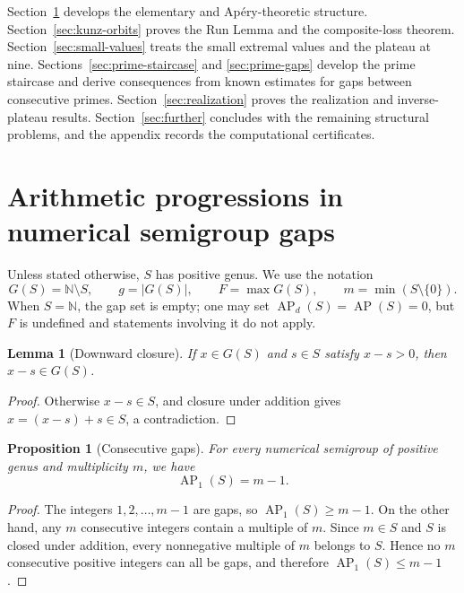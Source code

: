 \documentclass[11pt]{article}
\theoremstyle{plain}
\newtheorem{proposition}[theorem]{Proposition}
\newtheorem{lemma}[theorem]{Lemma}
\theoremstyle{definition}
\theoremstyle{remark}
\newcommand{\N}{\mathbb N}
\newcommand{\AP}{\operatorname{AP}}
\begin{document}
Section~\ref{sec:gap-aps} develops the elementary and Ap\'ery-theoretic
structure.  Section~\ref{sec:kunz-orbits} proves the Run Lemma and the
composite-loss theorem.  Section~\ref{sec:small-values} treats the small
extremal values and the plateau at nine.  Sections~\ref{sec:prime-staircase}
and \ref{sec:prime-gaps} develop the prime staircase and derive consequences
from known estimates for gaps between consecutive primes.
Section~\ref{sec:realization} proves the realization and
inverse-plateau results.  Section~\ref{sec:further} concludes with the
remaining structural problems, and the appendix records the computational
certificates.

\section{Arithmetic progressions in numerical semigroup gaps}
\label{sec:gap-aps}

Unless stated otherwise, $S$ has positive genus.  We use the notation
\[
  G(S)=\N\setminus S,
  \qquad g=|G(S)|,
  \qquad F=\max G(S),
  \qquad m=\min(S\setminus\{0\}).
\]
When $S=\N$, the gap set is empty; one may set $\AP_d(S)=\AP(S)=0$, but
$F$ is undefined and statements involving it do not apply.

\begin{lemma}[Downward closure]\label{lem:downward-closure}
If $x\in G(S)$ and $s\in S$ satisfy $x-s>0$, then $x-s\in G(S)$.
\end{lemma}

\begin{proof}
Otherwise $x-s\in S$, and closure under addition gives
$x=(x-s)+s\in S$, a contradiction.
\end{proof}

\begin{proposition}[Consecutive gaps]\label{prop:consecutive-gaps}
For every numerical semigroup of positive genus and multiplicity $m$, we have
\[
  \boxed{\AP_1(S)=m-1.}
\]
\end{proposition}

\begin{proof}
The integers $1,2,\ldots,m-1$ are gaps, so $\AP_1(S)\geq m-1$.  On the
other hand, any $m$ consecutive integers contain a multiple of $m$.  Since
$m\in S$ and $S$ is closed under addition, every nonnegative multiple of
$m$ belongs to $S$.  Hence no $m$ consecutive positive integers can all be
gaps, and therefore $\AP_1(S)\leq m-1$.
\end{proof}
\end{document}
